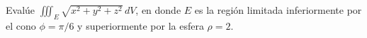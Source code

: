 \item Evalúe $\iiint_E \sqrt{x^2 + y^2 + z^2} \, dV$, en donde $E$ es la región limitada inferiormente por el cono $\phi = \pi/6$ y superiormente por la esfera $\rho = 2$.
